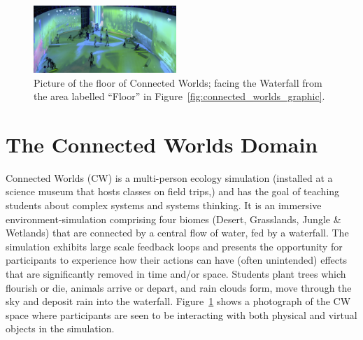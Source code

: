 \documentclass[letterpaper]{article} %
\newcommand{\citename}[1]{\citeauthor{#1}~\shortcite{#1}}
\begin{document}









\begin{figure}[t]
\centering
\includegraphics[width=0.48\textwidth]{./images/cw_viz2.png}
\caption{Picture of the floor of Connected Worlds; facing the Waterfall from the area labelled ``Floor'' in Figure~\ref{fig:connected_worlds_graphic}.}
\label{fig:connected_worlds_viz}
\end{figure}


\section{The Connected Worlds Domain}
\label{sec:cw_desc}
Connected Worlds (CW) is a multi-person ecology simulation (installed at a science museum that hosts classes on field trips,) and has the goal of teaching students about complex systems and systems thinking. 
It is an immersive environment-simulation comprising four biomes (Desert, Grasslands, Jungle \& Wetlands) that are connected by a central flow of water, fed by a waterfall. The simulation exhibits large scale feedback loops and presents the opportunity for participants to experience how their actions can have (often unintended) effects that are significantly removed in time and/or space. Students plant trees which flourish or die, animals arrive or depart, and rain clouds form, move through the sky and deposit rain into the waterfall. 
Figure~\ref{fig:connected_worlds_viz} shows a photograph of the CW space where participants are seen to be interacting with both physical and virtual objects in the simulation.
\end{document}
